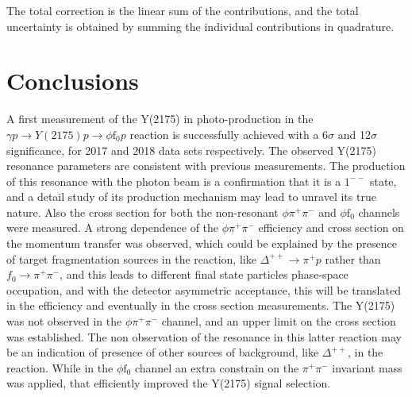 The total correction is the linear sum of the contributions, and the total uncertainty is obtained by summing the individual contributions in quadrature.

\section{Conclusions}
\label{chap.y2175.conc}

A first measurement of the Y(2175) in photo-production in the $\gamma p \rightarrow Y(2175) p \rightarrow \phi \mathrm{f}_0 p$ reaction is successfully achieved with a 6$\sigma$ and 12$\sigma$ significance, for 2017 and 2018 data sets respectively. The observed Y(2175) resonance parameters are consistent with previous measurements. The production of this resonance with the photon beam is a confirmation that it is a $1^{--}$ state, and a detail study of its production mechanism may lead to unravel its true nature. Also the cross section for both the non-resonant $\phi \pi^+\pi^-$ and $\phi \mathrm{f}_0$ channels were measured. A strong dependence of the $\phi \pi^+\pi^-$ efficiency and cross section on the momentum transfer was observed, which could be explained by the presence of target fragmentation sources in the reaction, like $\Delta^{++} \rightarrow \pi^+ p$ rather than ${f}_0 \rightarrow \pi^+\pi^-$, and this leads to different final state particles phase-space occupation, and with the detector asymmetric acceptance, this will be translated in the efficiency and eventually in the cross section measurements. The Y(2175) was not observed in the $\phi \pi^+\pi^-$ channel, and an upper limit on the cross section was established. The non observation of the resonance in this latter reaction may be an indication of presence of other sources of background, like $\Delta^{++}$, in the reaction. While in the $\phi \mathrm{f}_0$ channel an extra constrain on the $\pi^+\pi^-$ invariant mass was applied, that efficiently improved the Y(2175) signal selection.